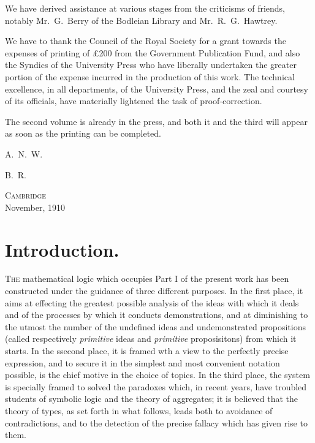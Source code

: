 \documentclass{scrartcl}
\begin{document}
We have derived assistance at various stages from the criticisms of friends, notably Mr.~G.~Berry of the Bodleian Library and Mr.~R.~G.~Hawtrey.

We have to thank the Council of the Royal Society for a grant towards the expenses of printing of \pounds 200 from the Government Publication Fund, and also the Syndics of the
University Press who have liberally undertaken the greater portion of the expense incurred in the production of this work. The technical excellence, in all departments, of the
University Press, and the zeal and courtesy of its officials, have materially lightened the task of proof-correction.

The second volume is already in the press, and both it and the third will appear as soon as the printing can be completed.

\hfill A.~N.~W.

\hfill B.~R.

\textsc{Cambridge}\\
\hspace*{2em}November, 1910


%

\section{Introduction.}

\textsc{The} mathematical logic which occupies Part I of the present work has been constructed under the guidance of three different purposes. In the first place, it aims at effecting the greatest
possible analysis of the ideas with which it deals and of the processes by which it conducts demonstrations, and at diminishing to the utmost the number of the undefined ideas and undemonstrated
propositions (called respectively \textit{primitive} ideas and \textit{primitive} proposisitons) from which it starts. In the ssecond place, it is framed wth a view to the perfectly precise
expression, and to secure it in the simplest and most convenient notation possible, is the chief motive in the choice of topics. In the third place, the system is specially framed to solved the 
paradoxes which, in recent years, have troubled students of symbolic logic and the theory of aggregates; it is believed that the theory of types, as set forth in what follows, leads both to
avoidance of contradictions, and to the detection of the precise fallacy which has given rise to them.
\end{document}
